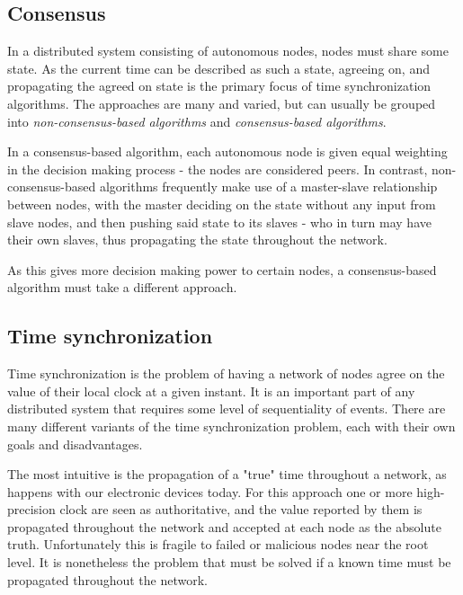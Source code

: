 \documentclass[a4paper,12pt]{article}
\begin{document}
\subsection{Consensus}
In a distributed system consisting of autonomous nodes, nodes must share some state. As the current time can be described as such a state, agreeing on, and propagating the agreed on state is the primary focus of time synchronization algorithms. The approaches are many and varied, but can usually be grouped into \textit{non-consensus-based algorithms} and \textit{consensus-based algorithms}.

In a consensus-based algorithm, each autonomous node is given equal weighting in the decision making process - the nodes are considered peers. In contrast, non-consensus-based algorithms frequently make use of a master-slave relationship between nodes, with the master deciding on the state without any input from slave nodes, and then pushing said state to its slaves - who in turn may have their own slaves, thus propagating the state throughout the network.

As this gives more decision making power to certain nodes, a consensus-based algorithm must take a different approach.

\subsection{Time synchronization} %


Time synchronization is the problem of having a network of nodes agree on the value of their local clock at a given instant. It is an important part of any distributed system that requires some level of sequentiality of events. There are many different variants of the time synchronization problem, each with their own goals and disadvantages.

The most intuitive is the propagation of a "true" time throughout a network, as happens with our electronic devices today. For this approach one or more high-precision clock are seen as authoritative, and the value reported by them is propagated throughout the network and accepted at each node as the absolute truth. Unfortunately this is fragile to failed or malicious nodes near the root level. It is nonetheless the problem that must be solved if a known time must be propagated throughout the network.
\end{document}
